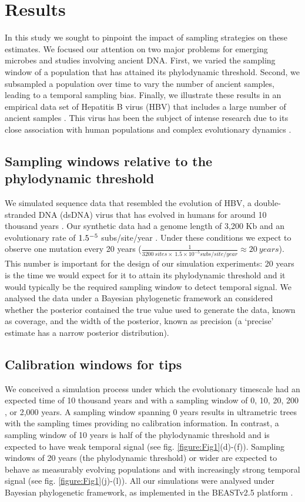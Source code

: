 \documentclass[11pt]{article}
\begin{document}
\section{Results}
In this study we sought to pinpoint the impact of sampling strategies on these estimates. We focused our attention on two major problems for emerging microbes and studies involving ancient DNA. First, we varied the sampling window of a population that has attained its phylodynamic threshold. Second, we subsampled a population over time to vary the number of ancient samples, leading to a temporal sampling bias. Finally, we illustrate these results in an empirical data set of Hepatitis B virus (HBV) that includes a large number of ancient samples \citep{kocher2021ten}. This virus has been the subject of intense research due to its close association with human populations and complex evolutionary dynamics \citep{paraskevis2013dating, ross2018paradox, kahila2012tracing}.

\subsection{Sampling windows relative to the phylodynamic threshold}
We simulated sequence data that resembled the evolution of HBV, a double-stranded DNA (dsDNA) virus that has evolved in humans for around 10 thousand years \citep{kocher2021ten}. Our synthetic data had a genome length of 3,200 Kb and an evolutionary rate of $1.5\time10^{-5}$ subs/site/year \citep{kocher2021ten, muhlemann2018ancient}. Under these conditions we expect to observe one mutation every 20 years ($\frac{1}{3200\ sites \times\ 1.5\times10^{-5}subs/site/year}\approx20\ years$). This number is important for the design of our simulation experiments: 20 years is the time we would expect for it to attain its phylodynamic threshold and it would typically be the required sampling window to detect temporal signal. We analysed the data under a Bayesian phylogenetic framework an considered whether the posterior contained the true value used to generate the data, known as coverage, and the width of the posterior, known as precision (a `precise' estimate has a narrow posterior distribution).

\subsection{Calibration windows for tips}
We conceived a simulation process under which the evolutionary timescale had an expected time of 10 thousand years and with a sampling window of 0, 10, 20, 200 , or 2,000 years. A sampling window spanning 0 years results in ultrametric trees with the sampling times providing no calibration information. In contrast, a sampling window of 10 years is half of the phylodynamic threshold and is expected to have weak temporal signal (see fig. \ref{figure:Fig1}(d)-(f)). Sampling windows of 20 years (the phylodynamic threshold) or wider are expected to behave as measurably evolving populations and with increasingly strong temporal signal (see fig. \ref{figure:Fig1}(j)-(l)). All our simulations were analysed under Bayesian phylogenetic framework, as implemented in the BEASTv2.5 platform \citep{bouckaert2019beast}.
\end{document}

